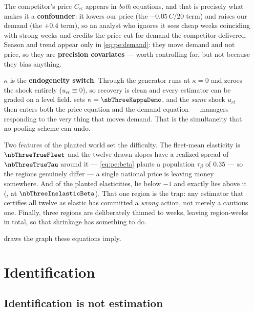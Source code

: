 The competitor's price $C_{rt}$ appears in \emph{both} equations, and that is precisely what makes
it a \textbf{confounder}: it lowers our price (the $-0.05\,C/20$ term) and raises our demand (the
$+0.4$ term), so an analyst who ignores it sees cheap weeks coinciding with strong weeks and
credits the price cut for demand the competitor delivered. Season and trend appear only in
\cref{eq:pe:demand}: they move demand and not price, so they are \textbf{precision covariates} ---
worth controlling for, but not because they bias anything.

$\kappa$ is the \textbf{endogeneity switch}. Through  the
generator runs at $\kappa = 0$ and zeroes the shock entirely ($u_{rt} \equiv 0$), so recovery is
clean and every estimator can be graded on a level field.  sets
$\kappa = \nbThreeKappaDemo$, and the \emph{same} shock $u_{rt}$ then enters both the price
equation and the demand equation --- managers responding to the very thing that moves demand. That
is the simultaneity that no pooling scheme can undo.

Two features of the planted world set the difficulty. The fleet-mean elasticity is
$\nbThreeTrueFleet$ and the twelve drawn slopes have a realized spread of $\nbThreeTrueTau$ around
it --- \cref{eq:pe:beta} plants a population $\tau_\beta$ of $0.35$ --- so the regions genuinely
differ --- a single national price is leaving money somewhere. And of the \nbThreeNRegions{}
planted elasticities, \nbThreeNTrueElastic{} lie below $-1$ and exactly \nbThreeNTrueInelastic{}
lies above it (\nbThreeInelasticRegion{}, at $\nbThreeInelasticBeta$). That one region is the trap:
any estimator that certifies all twelve as elastic has committed a \emph{wrong} action, not merely
a cautious one. Finally, three regions are deliberately thinned to \nbThreeObsMin{} weeks, leaving
\nbThreeNObs{} region-weeks in total, so that shrinkage has something to do.

 draws the graph these equations imply.



\section{Identification}
\label{sec:pe:ident}

\subsection*{Identification is not estimation}


